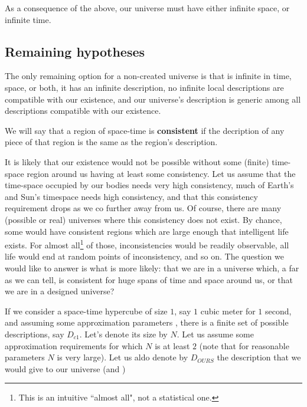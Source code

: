 \documentclass[a4paper
,draft
]{article}
\newcommand{\svn}[2][]{\todo[author=Virgil,color=red!25!white,#1]{#2}}
\newcommand{\definitie}[1]{\textbf{#1}}
\newcommand{\ghilimele}[1]{``#1"}
\begin{document}
As a consequence of the above, our universe must have either infinite space,
or infinite time.

\subsection{Remaining hypotheses}

The only remaining option for a non-created universe is that is infinite in
time, space, or both, it has an infinite description, no infinite local
descriptions are compatible with our existence, and our universe's
description is generic among all descriptions compatible with our existence.

We will say that a region of space-time is \definitie{consistent} if the
decription of any piece of that region is the same as the region's description.

It is likely that our existence would not be possible without some (finite)
time-space region around us having at least some consistency. Let us assume
that the time-space occupied by our bodies needs very high consistency, much
of Earth's and Sun's timespace needs high consistency, and that this
consistency requirement drops as we co further away from us. Of course,
there are many (possible or real) universes where this consistency does
not exist. By chance, some would have consistent regions which are large
enough that intelligent life exists. For almost all\footnote{This is an
intuitive \ghilimele{almost all}, not a statistical one.} of those,
inconsistencies would be readily observable, all life would end at
random points of inconsistency, and so on. The question we would like to
answer is what is more likely: that we are in a universe which, a far as we can tell, is consistent for huge spans of time and space around us, or that we are in a designed universe?

If we consider a space-time hypercube of size $1$, say $1$ cubic meter for $1$ second, and assuming some approximation parameters \svn{define these before this section}, there is a finite set of possible descriptions, say $D_{c1}$. Let's denote its size by $N$. Let us assume some approximation requirements for which $N$ is at least $2$ (note that for reasonable parameters $N$ is very large). Let us aldo denote by $D_{OURS}$ the description that we would give to our universe (and )
\end{document}
